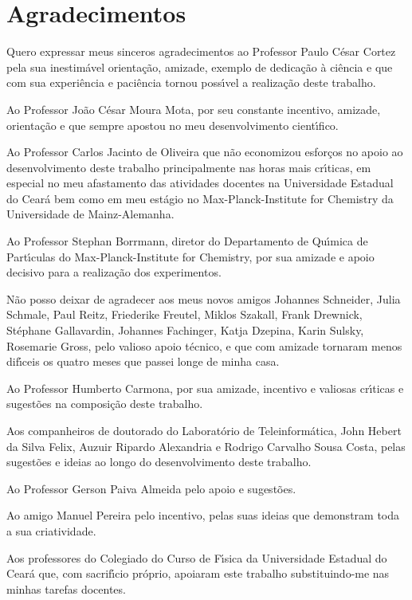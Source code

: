 \chapter*{Agradecimentos}
\label{CHP:ACKNOWLEDGMENT}%
\thispagestyle{empty}
Quero expressar meus sinceros agradecimentos ao Professor Paulo C\'{e}sar Cortez pela sua inestim\'{a}vel orienta\c{c}\~{a}o, amizade, exemplo de dedica\c{c}\~{a}o \`{a} ci\^{e}ncia e que com sua experi\^{e}ncia e paci\^{e}ncia tornou poss\'{\i}vel a realiza\c{c}\~{a}o deste trabalho.

Ao Professor Jo\~{a}o C\'{e}sar Moura Mota, por seu constante incentivo, amizade, orienta\c{c}\~{a}o e que sempre apostou no meu desenvolvimento cient\'{\i}fico.

Ao Professor Carlos Jacinto de Oliveira que n\~{a}o economizou esfor\c{c}os no apoio ao desenvolvimento deste trabalho principalmente nas horas mais cr\'{\i}ticas, em especial no meu afastamento das atividades docentes na Universidade Estadual do Cear\'{a} bem como em meu est\'{a}gio no Max-Planck-Institute for Chemistry da Universidade de Mainz-Alemanha.

Ao Professor Stephan Borrmann, diretor do Departamento de Qu\'{\i}mica de Part\'{\i}culas do Max-Planck-Institute for Chemistry, por sua amizade e apoio decisivo para a realiza\c{c}\~{a}o dos experimentos.

N\~{a}o posso deixar de agradecer aos meus novos amigos Johannes Schneider, Julia Schmale, Paul Reitz, Friederike Freutel, Miklos Szakall, Frank Drewnick, St\'{e}phane Gallavardin, Johannes Fachinger, Katja Dzepina,  Karin Sulsky, Rosemarie Gross, pelo valioso apoio t\'{e}cnico, e que com amizade tornaram menos dif\'{\i}ceis os quatro meses que passei longe de minha casa.

Ao Professor Humberto Carmona, por sua amizade, incentivo e valiosas cr\'{\i}ticas e sugest\~{o}es na composi\c{c}\~{a}o deste trabalho.

Aos companheiros de doutorado do Laborat\'{o}rio de Teleinform\'{a}tica, John Hebert da Silva Felix, Auzuir Ripardo Alexandria  e Rodrigo Carvalho Sousa Costa, pelas sugest\~{o}es e ideias ao longo do desenvolvimento deste trabalho.

Ao Professor Gerson Paiva Almeida pelo apoio e sugest\~{o}es.

Ao amigo Manuel Pereira pelo incentivo, pelas suas ideias que demonstram toda a sua criatividade.

Aos professores do Colegiado do Curso de F\'{\i}sica da Universidade Estadual do Cear\'{a} que, com sacrif\'{\i}cio pr\'{o}prio, apoiaram este trabalho substituindo-me nas minhas tarefas docentes.

